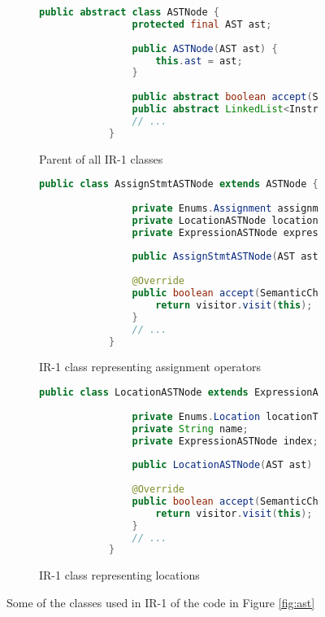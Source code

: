 \documentclass{article}[11pt]
\begin{document}
\begin{figure}
    \begin{subfigure}[t]{1\linewidth}
        \begin{lstlisting}[language=Java]
            public abstract class ASTNode {
                protected final AST ast;
                
                public ASTNode(AST ast) {
                    this.ast = ast;
                }
                
                public abstract boolean accept(SemanticCheckVisitor visitor);
                public abstract LinkedList<Instruction> accept(AssemblerVisitor visitor);
                // ...
            }
        \end{lstlisting}
        \caption{Parent of all IR-1 classes}
    \end{subfigure}
    
    \begin{subfigure}[t]{0.5\linewidth}
        \begin{lstlisting}[language=Java]
            public class AssignStmtASTNode extends ASTNode {
            
                private Enums.Assignment assignment;
                private LocationASTNode location;
                private ExpressionASTNode expression;
                
                public AssignStmtASTNode(AST ast) { /* ... */ }
                
                @Override
                public boolean accept(SemanticCheckVisitor visitor) {
                    return visitor.visit(this);
                }
                // ...
            }
        \end{lstlisting}
        \caption{IR-1 class representing assignment operators}
    \end{subfigure}
    \hspace{0.5cm}
    \begin{subfigure}[t]{0.5\linewidth}
        \begin{lstlisting}[language=Java]
            public class LocationASTNode extends ExpressionASTNode {
    
                private Enums.Location locationType;
                private String name;
                private ExpressionASTNode index;
                
                public LocationASTNode(AST ast) { /* ... */ }
                
                @Override
                public boolean accept(SemanticCheckVisitor visitor) {
                    return visitor.visit(this);
                }
                // ...
            }
        \end{lstlisting}
        \caption{IR-1 class representing locations}
    \end{subfigure}
    
    \caption{Some of the classes used in IR-1 of the code in Figure \ref{fig:ast}}
    \label{fig:code}
\end{figure}
\end{document}
